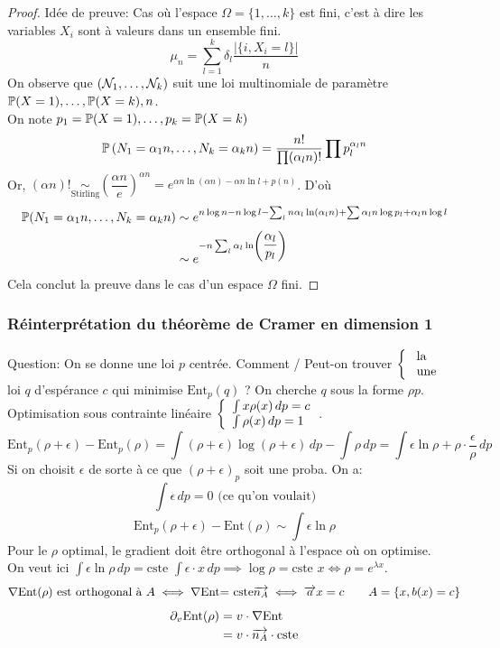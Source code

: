 \documentclass[]{report}
\begin{document}
    \begin{proof}
        Idée de preuve: Cas où l'espace $\Omega=\{1,\ldots,k\}$ est fini, c'est à dire les variables $X_i$ sont à valeurs dans un ensemble fini.
        \[\mu_n=\sum_{l=1}^{k}\delta_l\dfrac{\left|\{i,X_i=l\}\right|}{n}\]
        On observe que $(\mathcal{N}_1,\ldots,\mathcal{N}_k)$ suit une loi multinomiale de paramètre $\mathbb{P}(X=1),\ldots,\mathbb{P}(X=k),n$.\\
        On note $p_1=\mathbb{P}(X=1),\ldots,p_k=\mathbb{P}(X=k)$
        \[\mathbb{P}\left(N_1=\alpha_1 n,\ldots,N_k=\alpha_k n\right)=\dfrac{n!}{\prod (\alpha_l n)!} \prod p_l^{\alpha_l n}\]
        Or, $\displaystyle{(\alpha n)! \underset{\text{Stirling}}{\sim}\left(\dfrac{\alpha n}{e}\right)^{\alpha n}= e^{\alpha n \ln (\alpha n) -\alpha n \ln l+ p(n)}}$. D'où
        \begin{align*}
            \mathbb{P}(N_1=\alpha_1 n,\ldots, N_k=\alpha_k n)&\sim e^{n\log n -n\log l-\sum_l n\alpha_l \ln (\alpha_l n)+\sum \alpha_l n \log p_l +\alpha_l n\log l}\\
            &\sim e^{-n \sum_l \alpha_l \ln \left(\dfrac{\alpha_l}{p_l}\right)}
        \end{align*}
        Cela conclut la preuve dans le cas d'un espace $\Omega$ fini.
    \end{proof}

    \subsubsection*{Réinterprétation du théorème de Cramer en dimension 1}

    Question: On se donne une loi $p$ centrée. Comment / Peut-on trouver $\left\{\begin{array}{ll} \text{ la}\\ \text{ une} \end{array} \right.$ loi $q$ d'espérance $c$ qui minimise $\displaystyle{\text{Ent}_p(q)}$ ? On cherche $q$ sous la forme $\rho p$.\\
    Optimisation sous contrainte linéaire $\displaystyle{  \left\{\begin{array}{ll} \int x\rho( x)\, dp=c \\ \int \rho(x)\, dp=1 \end{array} \right. }$.
    \[\text{Ent}_p (\rho+\epsilon)-\text{Ent}_p (\rho)=\int (\rho+\epsilon)\log (\rho+\epsilon)\, dp -\int \rho \, dp=\int \epsilon \ln \rho +\rho \cdot \dfrac{\epsilon}{\rho} \, dp\]
    Si on choisit $\epsilon$ de sorte à ce que $(\rho+\epsilon)_p$ soit une proba. On a:
    \[\int \epsilon \, dp=0 \text{ (ce qu'on voulait)}\]
    \[\text{Ent}_p (\rho+\epsilon)-\text{Ent} (\rho)\sim \int \epsilon \ln \rho\]
    Pour le $\rho$ optimal, le gradient doit être orthogonal à l'espace où on optimise.\\
    On veut ici $\displaystyle{\int \epsilon \ln \rho \, dp=\text{cste }\int \epsilon \cdot x\, dp\implies \log \rho=\text{cste }x\iff \rho=e^{\lambda x}}$.\\
    \[\nabla \text{Ent} (\rho)\text{ est orthogonal à }A\iff \nabla \text{Ent$=$ cste}\overrightarrow{ n_A}\iff \overrightarrow{a}x=c\qquad A=\{x,b(x)=c\}\]
    \begin{align*}
        \partial_v \text{Ent} (\rho)&= v\cdot \nabla \text{Ent}\\
        &= v\cdot \overrightarrow{n_A}\cdot \text{cste}
    \end{align*}
\end{document}
